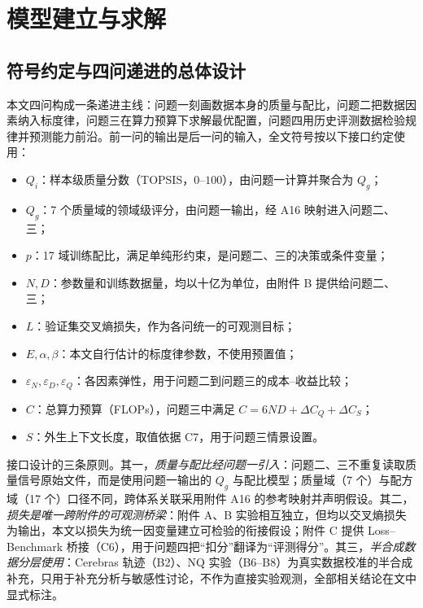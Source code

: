 \section{模型建立与求解}
\label{sec:model}

\subsection{符号约定与四问递进的总体设计}
\label{sec:framework}

本文四问构成一条递进主线：问题一刻画数据本身的质量与配比，问题二把数据因素纳入标度律，问题三在算力预算下求解最优配置，问题四用历史评测数据检验规律并预测能力前沿。前一问的输出是后一问的输入，全文符号按以下接口约定使用：

\begin{itemize}
  \item $Q_i$：样本级质量分数（TOPSIS，$0$--$100$），由问题一计算并聚合为 $Q_g$；
  \item $Q_g$：7 个质量域的领域级评分，由问题一输出，经 A16 映射进入问题二、三；
  \item $p$：17 域训练配比，满足单纯形约束，是问题二、三的决策或条件变量；
  \item $N,D$：参数量和训练数据量，均以十亿为单位，由附件 B 提供给问题二、三；
  \item $L$：验证集交叉熵损失，作为各问统一的可观测目标；
  \item $E,\alpha,\beta$：本文自行估计的标度律参数，不使用预置值；
  \item $\varepsilon_N,\varepsilon_D,\varepsilon_Q$：各因素弹性，用于问题二到问题三的成本--收益比较；
  \item $C$：总算力预算（FLOPs），问题三中满足 $C=6ND+\Delta C_Q+\Delta C_S$；
  \item $S$：外生上下文长度，取值依据 C7，用于问题三情景设置。
\end{itemize}

接口设计的三条原则。其一，\emph{质量与配比经问题一引入}：问题二、三不重复读取质量信号原始文件，而是使用问题一输出的 $Q_g$ 与配比模型；质量域（7 个）与配方域（17 个）口径不同，跨体系关联采用附件 A16 的参考映射并声明假设。其二，\emph{损失是唯一跨附件的可观测桥梁}：附件 A、B 实验相互独立，但均以交叉熵损失为输出，本文以损失为统一因变量建立可检验的衔接假设；附件 C 提供 Loss--Benchmark 桥接（C6），用于问题四把“扣分”翻译为“评测得分”。其三，\emph{半合成数据分层使用}：Cerebras 轨迹（B2）、NQ 实验（B6--B8）为真实数据校准的半合成补充，只用于补充分析与敏感性讨论，不作为直接实验观测，全部相关结论在文中显式标注。

